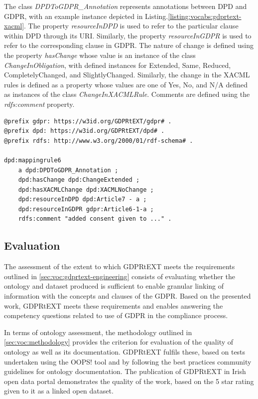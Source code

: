 The class \textit{DPDToGDPR\_Annotation} represents annotations between DPD and GDPR, with an example instance depicted in Listing.\ref{listing:vocabs:gdprtext-xacml}. The property \textit{resourceInDPD} is used to refer to the particular clause within DPD through its URI. Similarly, the property \textit{resourceInGDPR} is used to refer to the corresponding clause in GDPR. The nature of change is defined using the property \textit{hasChange} whose value is an instance of the class \textit{ChangeInObligation}, with defined instances for Extended, Same, Reduced, CompletelyChanged, and SlightlyChanged. Similarly, the change in the XACML rules is defined as a property whose values are one of Yes, No, and N/A defined as instances of the class \textit{ChangeInXACMLRule}. Comments are defined using the \textit{rdfs:comment} property.
\begin{lstlisting}[label={listing:vocabs:gdprtext-xacml},caption={Example annotation of associating obligation between DPD and GDPR with indication of corresponding changes required to reuse DPD compliance XACML rules for GDPR requirements}]
@prefix gdpr: https://w3id.org/GDPRtEXT/gdpr# .
@prefix dpd: https://w3id.org/GDPRtEXT/dpd# .
@prefix rdfs: http://www.w3.org/2000/01/rdf-schema# .

dpd:mappingrule6
    a dpd:DPDToGDPR_Annotation ;
    dpd:hasChange dpd:ChangeExtended ;
    dpd:hasXACMLChange dpd:XACMLNoChange ;
    dpd:resourceInDPD dpd:Article7 - a ;
    dpd:resourceInGDPR gdpr:Article6-1-a ;
    rdfs:comment "added consent given to ..." .
\end{lstlisting}


\subsection{Evaluation}
The assessment of the extent to which GDPRtEXT meets the requirements outlined in \autoref{sec:voc:gdprtext-engineering} consists of evaluating whether the ontology and dataset produced is sufficient to enable granular linking of information with the concepts and clauses of the GDPR. Based on the presented work, GDPRtEXT meets these requirements and enables answering the competency questions related to use of GDPR in the compliance process.

In terms of ontology assessment, the methodology outlined in \autoref{sec:voc:methodology} provides the criterion for evaluation of the quality of ontology as well as its documentation. GDPRtEXT fulfils these, based on tests undertaken using the OOPS! tool and by following the best practices community guidelines for ontology documentation.
The publication of GDPRtEXT in Irish open data portal demonstrates the quality of the work, based on the 5 star rating given to it as a linked open dataset.

